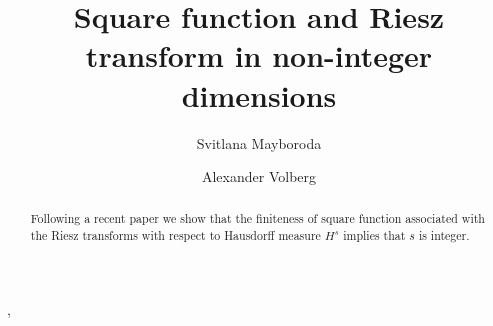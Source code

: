 \documentclass{elsart3-1}
\begin{document}
\centerline{}
\begin{frontmatter}


\title{Square function and Riesz transform  in non-integer dimensions}



\author[SM]{Svitlana Mayboroda},
\author[AV]{Alexander Volberg}

\address[SM]{Department of Mathematics, Purdue University, 150 N. University Street, West Lafayette, IN 47907-2067, USA}
\address[AV]{Department of Mathematics, Michigan State University, East Lansing, MI 48824, USA}


\medskip
\begin{center}
\end{center}



\begin{abstract}
Following a recent paper \cite{RdVTolsa} we show that the finiteness of square function associated with the Riesz transforms with respect to Hausdorff measure $H^s$ implies that $s$ is integer. 

\baselineskip


\end{abstract}
\end{frontmatter}
\end{document}
